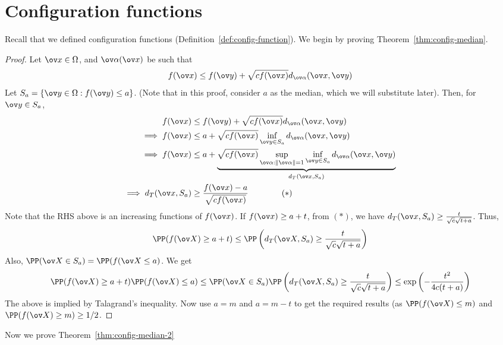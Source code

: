 \chapter{Configuration functions}
Recall that we defined configuration functions (Definition~\ref{def:config-function}). We begin by proving Theorem~\ref{thm:config-median}.
\begin{proof}
Let $\ov x \in \Omega$, and $\ov\alpha(\ov x)$ be such that
\[
f(\ov x) \leq f(\ov y) + \sqrt{c f(\ov x)} d_{\ov\alpha}(\ov x, \ov y)
\]
Let $S_a = \{\ov y \in \Omega: f(\ov y) \leq a\}$. (Note that in this proof, consider $a$ as the median, which we will substitute later). Then, for $\ov y \in S_a$, 
\begin{align*}
f(\ov x) &\leq f(\ov y) + \sqrt{c f(\ov x)} d_{\ov\alpha}(\ov x, \ov y) \\
\implies f(\ov x) &\leq a + \sqrt{c f(\ov x)} \inf_{\ov y\in S_a} d_{\ov\alpha}(\ov x, \ov y) \\
\implies f(\ov x) &\leq a + \underbrace{\sqrt{c f(\ov x)} \sup_{\ov \alpha: \|\ov\alpha\|=1} \inf_{\ov y\in S_a} d_{\ov\alpha}(\ov x, \ov y)}_{d_T(\ov x, S_a)} \\
\implies d_T(\ov x, S_a) &\geq \frac{f(\ov x) -a}{\sqrt{cf(\ov x)}} \qquad \qquad (*)
\end{align*}
Note that the RHS above is an increasing functions of $f(\ov x)$. If $f(\ov x) \geq a +t$, from $(*)$, we have $d_T(\ov x, S_a) \geq \frac{t}{\sqrt{c}\sqrt{t+a}}$. Thus,
\[
\PP(f(\ov X) \geq a + t) \leq \PP\left(d_T(\ov X, S_a) \geq \frac{t}{\sqrt{c}\sqrt{t+a}}\right)
\]
Also, $\PP(\ov X \in S_a) = \PP(f(\ov X \leq a)$. We get
\[
\PP(f(\ov X) \geq a + t) \PP(f(\ov X) \leq a) \leq \PP(\ov X \in S_a) \PP\left(d_T(\ov X, S_a) \geq \frac{t}{\sqrt{c}\sqrt{t+a}}\right) \leq \exp\left(-\frac{t^2}{4c(t+a)}\right)
\]
The above is implied by Talagrand's inequality. Now use $a = m$ and $a = m-t$ to get the required results (as $\PP(f(\ov X) \leq m)$ and $ \PP(f(\ov X) \geq m) \geq 1/2$.
\end{proof}
Now we prove Theorem~\ref{thm:config-median-2}

